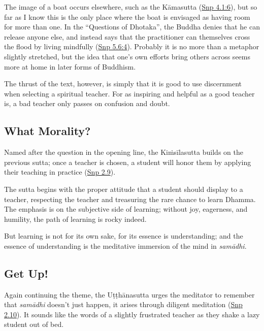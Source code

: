 \documentclass[12pt,openany]{book}%
\begin{document}
The image of a boat occurs elsewhere, such as the \textsanskrit{Kāmasutta} (\href{https://suttacentral.net/snp4.1/en/sujato\#6}{Snp 4.1:6}), but so far as I know this is the only place where the boat is envisaged as having room for more than one. In the “Questions of Dhotaka”, the Buddha denies that he can release anyone else, and instead says that the practitioner can themselves cross the flood by living mindfully (\href{https://suttacentral.net/snp5.6/en/sujato\#4}{Snp 5.6:4}). Probably it is no more than a metaphor slightly stretched, but the idea that one’s own efforts bring others across seems more at home in later forms of Buddhism.

The thrust of the text, however, is simply that it is good to use discernment when selecting a spiritual teacher. For as inspiring and helpful as a good teacher is, a bad teacher only passes on confusion and doubt.

\subsection*{What Morality?}

Named after the question in the opening line, the \textsanskrit{Kiṁsīlasutta} builds on the previous sutta; once a teacher is chosen, a student will honor them by applying their teaching in practice (\href{https://suttacentral.net/snp2.9/en/sujato}{Snp 2.9}).

The sutta begins with the proper attitude that a student should display to a teacher, respecting the teacher and treasuring the rare chance to learn Dhamma. The emphasis is on the subjective side of learning; without joy, eagerness, and humility, the path of learning is rocky indeed.

But learning is not for its own sake, for its essence is understanding; and the essence of understanding is the meditative immersion of the mind in \textit{\textsanskrit{samādhi}}.

\subsection*{Get Up!}

Again continuing the theme, the \textsanskrit{Uṭṭhānasutta} urges the meditator to remember that \textit{\textsanskrit{samādhi}} doesn’t just happen, it arises through diligent meditation (\href{https://suttacentral.net/snp2.10/en/sujato}{Snp 2.10}). It sounds like the words of a slightly frustrated teacher as they shake a lazy student out of bed.
\end{document}
